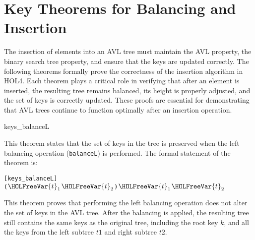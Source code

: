 \chapter{Key Theorems for Balancing and Insertion}\label{chap:LaTeXAdvice}

The insertion of elements into an AVL tree must maintain the AVL property, the binary search tree property, and ensure that the keys are updated correctly. The following theorems formally prove the correctness of the insertion algorithm in HOL4. Each theorem plays a critical role in verifying that after an element is inserted, the resulting tree remains balanced, its height is properly adjusted, and the set of keys is correctly updated. These proofs are essential for demonstrating that AVL trees continue to function optimally after an insertion operation.

\begin{thm}{keys\_balanceL}

This theorem states that the set of keys in the tree is preserved when the left balancing operation (\texttt{balanceL}) is performed. The formal statement of the theorem is:


\begin{alltt}
	[keys_balanceL]
	\HOLTokenTurnstile{}  (   \ensuremath{\HOLFreeVar{t}\sb{\mathrm{1}}} \ensuremath{\HOLFreeVar{t}\sb{\mathrm{2}}}) \HOLSymConst{=} \HOLTokenLeftbrace{}\HOLTokenRightbrace{} \HOLSymConst{\HOLTokenUnion{}}  \ensuremath{\HOLFreeVar{t}\sb{\mathrm{1}}} \HOLSymConst{\HOLTokenUnion{}}  \ensuremath{\HOLFreeVar{t}\sb{\mathrm{2}}}
\end{alltt}


\end{thm}
This theorem proves that performing the left balancing operation does not alter the set of keys in the AVL tree. After the balancing is applied, the resulting tree still contains the same keys as the original tree, including the root key \( k \), and all the keys from the left subtree \( t1 \) and right subtree \( t2 \).

